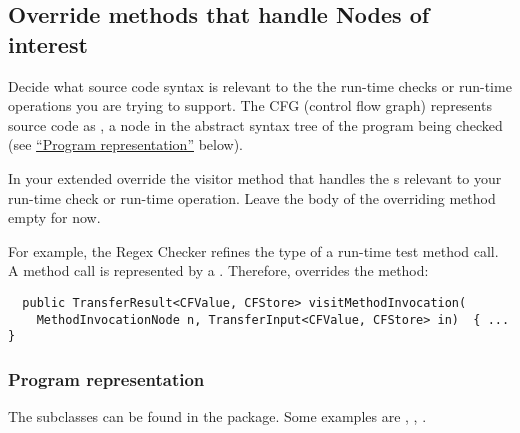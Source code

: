 \subsection{Override methods that handle Nodes of interest\label{creating-dataflow-override-methods}}

Decide what source code syntax is relevant to the the run-time checks or
run-time operations you are trying to support.  The CFG (control flow
graph) represents source code as , a
node in the abstract syntax tree of the program being checked (see
\href{#creating-dataflow-representation}{``Program representation''} below).

In your extended 
override the visitor method that handles the s
relevant to your run-time check or run-time operation.
Leave the body of the overriding method empty for now.

For example, the Regex Checker refines the type of a run-time test method
call.  A method call is represented by a
.  Therefore,
 overrides the
 method:

\begin{smaller}
\begin{Verbatim}
  public TransferResult<CFValue, CFStore> visitMethodInvocation(
    MethodInvocationNode n, TransferInput<CFValue, CFStore> in)  { ... }
\end{Verbatim}
\end{smaller}


\subsubsection{Program representation\label{creating-dataflow-representation}}


The  subclasses can be found in the
 package.  Some examples are
,
,
.

